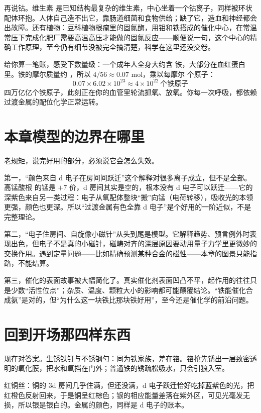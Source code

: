 再说钴。维生素  是已知结构最复杂的维生素，中心坐着一个钴离子，同样被环状配体环抱。人体自己造不出它，靠肠道细菌和食物供给；缺了它，造血和神经都会出故障。还有植物：豆科植物根瘤里的固氮酶，用钼和铁搭成的催化中心，在常温常压下完成化肥厂需要高温高压才能做的固氮反应——顺便说一句，这个中心的精确工作原理，至今仍有细节没被完全搞清楚，科学在这里还没交卷。

给你算一笔账，感受下数量级：一个成年人全身大约含  铁，大部分在血红蛋白里。铁的摩尔质量约 ，所以 $4/56 \approx 0.07$ mol，乘以每摩尔  个原子：
\[0.07 \times 6.02\times 10^{23} \approx 4\times 10^{22}\ \text{个铁原子}\]
四万亿亿个铁原子，此刻正在你的血管里轮流抓氧、放氧。你每一次呼吸，都依赖过渡金属的配位化学正常运转。

\section{本章模型的边界在哪里}

老规矩，说完好用的部分，必须说它会怎么失效。

第一，“颜色来自 d 电子在房间间跃迁”这个解释对很多离子成立，但不是全部。高锰酸根  的锰是 $+7$ 价，d 房间其实是空的，根本没有 d 电子可以跃迁——它的深紫色来自另一类过程：电子从氧配体整块“搬”向锰（电荷转移），吸收光的本领更强，颜色也更深。所以“过渡金属有色全靠 d 电子”是个好用的一阶近似，不是完整理论。

第二，“电子住房间、自旋像小磁针”从头到尾是模型。它解释趋势、预言例外时表现出色，但电子不是真的小磁针，磁畴对齐的深层原因要动用量子力学里更微妙的交换作用。遇到定量问题——比如精确预测某种合金的磁性——本章的图景只能指路，不能结算。

第三，催化的表面故事被大幅简化了。真实催化剂表面凹凸不平，起作用的往往只是少数“活性位点”；杂质、温度、颗粒大小的影响都可能颠覆结论。“铁能催化合成氨”是对的，但“为什么这一块铁比那块铁好用”，至今还是催化学的前沿问题。

\section{回到开场那四样东西}

现在对答案。生锈铁钉与不锈钢勺：同为铁家族，差在铬。铬抢先锈出一层致密透明的氧化膜，把水和氧挡在门外；普通铁的锈疏松吸水，只会引狼入室。

红铜丝：铜的 3d 房间几乎住满，但还没满，d 电子跃迁恰好吃掉蓝紫色的光，把红橙色反射回来，于是铜呈红棕色；银的相应能量差落在紫外区，可见光毫发无损，所以银是银白的。金属的颜色，同样是 d 电子的账本。

